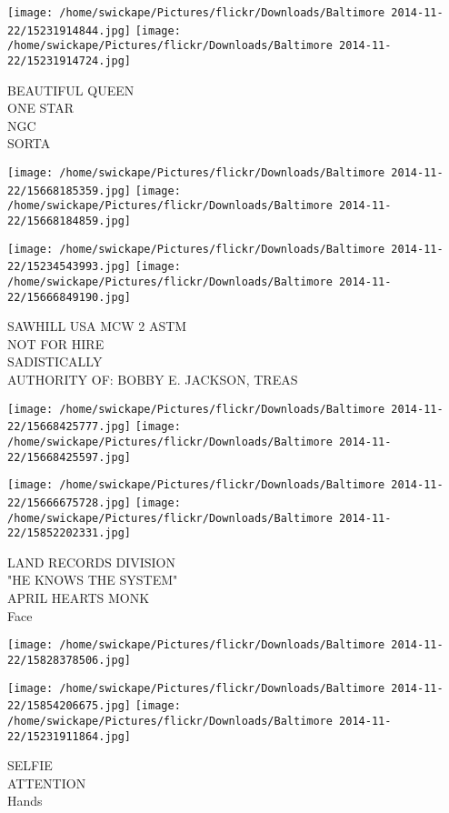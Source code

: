 \documentclass[10pt,letterpaper]{article}
\begin{document}
\texttt{[image: /home/swickape/Pictures/flickr/Downloads/Baltimore 2014-11-22/15231914844.jpg]}
\texttt{[image: /home/swickape/Pictures/flickr/Downloads/Baltimore 2014-11-22/15231914724.jpg]}

BEAUTIFUL QUEEN\\
ONE STAR\\
NGC\\
SORTA
\pagebreak

\texttt{[image: /home/swickape/Pictures/flickr/Downloads/Baltimore 2014-11-22/15668185359.jpg]}
\texttt{[image: /home/swickape/Pictures/flickr/Downloads/Baltimore 2014-11-22/15668184859.jpg]}

\texttt{[image: /home/swickape/Pictures/flickr/Downloads/Baltimore 2014-11-22/15234543993.jpg]}
\texttt{[image: /home/swickape/Pictures/flickr/Downloads/Baltimore 2014-11-22/15666849190.jpg]}

SAWHILL USA MCW 2 ASTM\\
NOT FOR HIRE\\
SADISTICALLY\\
AUTHORITY OF: BOBBY E. JACKSON, TREAS
\pagebreak

\texttt{[image: /home/swickape/Pictures/flickr/Downloads/Baltimore 2014-11-22/15668425777.jpg]}
\texttt{[image: /home/swickape/Pictures/flickr/Downloads/Baltimore 2014-11-22/15668425597.jpg]}

\texttt{[image: /home/swickape/Pictures/flickr/Downloads/Baltimore 2014-11-22/15666675728.jpg]}
\texttt{[image: /home/swickape/Pictures/flickr/Downloads/Baltimore 2014-11-22/15852202331.jpg]}

LAND RECORDS DIVISION\\
"HE KNOWS THE SYSTEM"\\
APRIL HEARTS MONK\\
Face
\pagebreak

\texttt{[image: /home/swickape/Pictures/flickr/Downloads/Baltimore 2014-11-22/15828378506.jpg]}

\vspace{0.25in}
\texttt{[image: /home/swickape/Pictures/flickr/Downloads/Baltimore 2014-11-22/15854206675.jpg]}
\texttt{[image: /home/swickape/Pictures/flickr/Downloads/Baltimore 2014-11-22/15231911864.jpg]}

SELFIE\\
ATTENTION\\
Hands
\pagebreak
\end{document}
